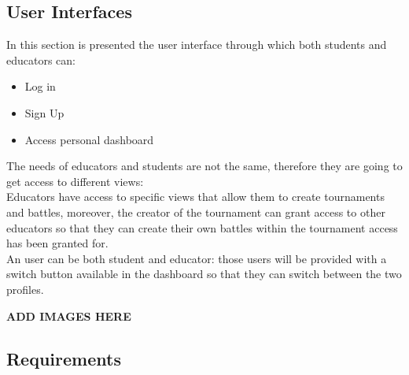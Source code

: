 \documentclass{article}
\begin{document}
\subsection{User Interfaces}
In this section is presented the user interface through which both students and educators can:
\begin{itemize}
    \item Log in
    \item Sign Up
    \item Access personal dashboard
\end{itemize}
The needs of educators and students are not the same, therefore they are going to get access to different views:\\
Educators have access to specific views that allow them to create tournaments and battles, moreover, the creator of the tournament can grant access to other educators so that they can create their own battles within the tournament access has been granted for.\\
An user can be both student and educator: those users will be provided with a switch button available in the dashboard so that they can switch between the two profiles.
\begin{center}
    \textbf{ADD IMAGES HERE}\\
\end{center}

\subsection{Requirements}
\end{document}
